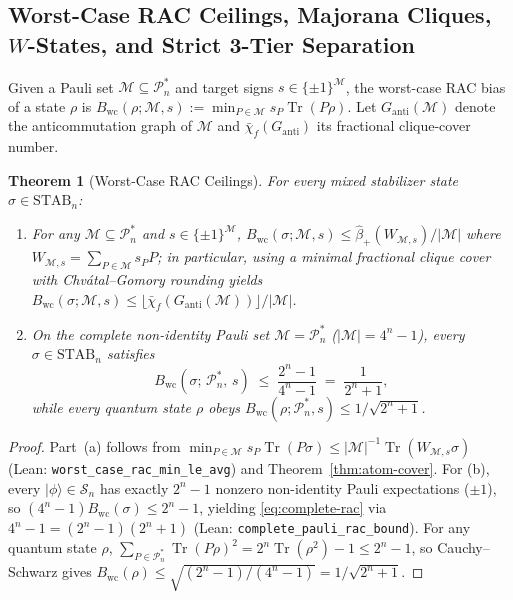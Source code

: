 \documentclass[11pt,a4paper]{article}
\newtheorem{theorem}{Theorem}[section]
\theoremstyle{definition}
\theoremstyle{remark}
\newcommand{\STAB}{\mathrm{STAB}}
\newcommand{\Pauli}{\mathcal{P}}
\newcommand{\Tr}{\operatorname{Tr}}
\newcommand{\Code}[1]{{\small\texttt{#1}}}
\begin{document}
\subsection{Worst-Case RAC Ceilings, Majorana Cliques, \texorpdfstring{$W$}{W}-States, and Strict 3-Tier Separation}
Given a Pauli set $\mathcal{M} \subseteq \Pauli_n^*$ and target signs $s \in \{\pm 1\}^{\mathcal{M}}$, the worst-case RAC bias \cite{Zamora2026RAC} of a state $\rho$ is $B_{\mathrm{wc}}(\rho; \mathcal{M}, s) := \min_{P \in \mathcal{M}} s_P \Tr(P\rho)$. Let $G_{\mathrm{anti}}(\mathcal{M})$ denote the anticommutation graph of $\mathcal{M}$ and $\bar{\chi}_f(G_{\mathrm{anti}})$ its fractional clique-cover number.

\begin{theorem}[Worst-Case RAC Ceilings]
\label{thm:rac}
For every mixed stabilizer state $\sigma \in \STAB_n$:
\begin{enumerate}[label=(\alph*),leftmargin=1.8em,itemsep=2pt]
  \item For any $\mathcal{M} \subseteq \Pauli_n^*$ and $s \in \{\pm 1\}^{\mathcal{M}}$, $B_{\mathrm{wc}}(\sigma; \mathcal{M}, s) \le \hat{\beta}_+(W_{\mathcal{M},s})/|\mathcal{M}|$ where $W_{\mathcal{M},s} = \sum_{P \in \mathcal{M}} s_P P$; in particular, using a minimal fractional clique cover with Chv\'atal--Gomory rounding yields $B_{\mathrm{wc}}(\sigma; \mathcal{M}, s) \le \lfloor \bar{\chi}_f(G_{\mathrm{anti}}(\mathcal{M})) \rfloor / |\mathcal{M}|$.
  \item On the complete non-identity Pauli set $\mathcal{M} = \Pauli_n^*$ ($|\mathcal{M}| = 4^n - 1$), every $\sigma \in \STAB_n$ satisfies
  \begin{equation}
    B_{\mathrm{wc}}(\sigma;\, \Pauli_n^*,\, s) \;\le\; \frac{2^n - 1}{4^n - 1} \;=\; \frac{1}{2^n + 1},
    \label{eq:complete-rac}
  \end{equation}
  while every quantum state $\rho$ obeys $B_{\mathrm{wc}}(\rho; \Pauli_n^*, s) \le 1/\sqrt{2^n + 1}$.
\end{enumerate}
\end{theorem}
\begin{proof}
Part~(a) follows from $\min_{P \in \mathcal{M}} s_P \Tr(P\sigma) \le |\mathcal{M}|^{-1}\Tr(W_{\mathcal{M},s}\sigma)$ (Lean: \Code{worst\_\allowbreak case\_\allowbreak rac\_\allowbreak min\_\allowbreak le\_\allowbreak avg}) and Theorem~\ref{thm:atom-cover}. For (b), every $|\phi\rangle \in \mathcal{S}_n$ has exactly $2^n - 1$ nonzero non-identity Pauli expectations ($\pm 1$), so $(4^n - 1) B_{\mathrm{wc}}(\sigma) \le 2^n - 1$, yielding \eqref{eq:complete-rac} via $4^n - 1 = (2^n - 1)(2^n + 1)$ (Lean: \Code{complete\_\allowbreak pauli\_\allowbreak rac\_\allowbreak bound}). For any quantum state $\rho$, $\sum_{P \in \Pauli_n^*} \Tr(P\rho)^2 = 2^n \Tr(\rho^2) - 1 \le 2^n - 1$, so Cauchy--Schwarz gives $B_{\mathrm{wc}}(\rho) \le \sqrt{(2^n - 1)/(4^n - 1)} = 1/\sqrt{2^n + 1}$.
\end{proof}
\end{document}

